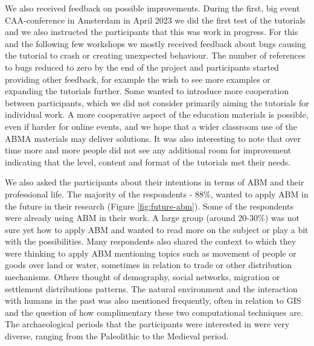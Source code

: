 \documentclass[
]{article}
\begin{document}
We also received feedback on possible improvements. During the first, big event CAA-conference in Amsterdam in April 2023 we did the first test of the tutorials and we also instructed the participants that this was work in progress. For this and the following few workshops we mostly received feedback about bugs causing the tutorial to crash or creating unexpected behaviour. The number of references to bugs reduced to zero by the end of the project and participants started providing other feedback, for example the wish to see more examples or expanding the tutorials further. Some wanted to introduce more cooperation between participants, which we did not consider primarily aiming the tutorials for individual work. A more cooperative aspect of the education materials is possible, even if harder for online events, and we hope that a wider classroom use of the ABMA materials may deliver solutions. It was also interesting to note that over time more and more people did not see any additional room for improvement indicating that the level, content and format of the tutorials met their needs.

We also asked the participants about their intentions in terms of ABM and their professional life. The majority of the respondents - 88\%, wanted to apply ABM in the future in their research (Figure \ref{fig:future-abm}). Some of the respondents were already using ABM in their work. A large group (around 20-30\%) was not sure yet how to apply ABM and wanted to read more on the subject or play a bit with the possibilities. Many respondents also shared the context to which they were thinking to apply ABM mentioning topics such as movement of people or goods over land or water, sometimes in relation to trade or other distribution mechanisms. Others thought of demography, social networks, migration or settlement distributions patterns. The natural environment and the interaction with humans in the past was also mentioned frequently, often in relation to GIS and the question of how complimentary these two computational techniques are. The archaeological periods that the participants were interested in were very diverse, ranging from the Paleolithic to the Medieval period.
\end{document}
